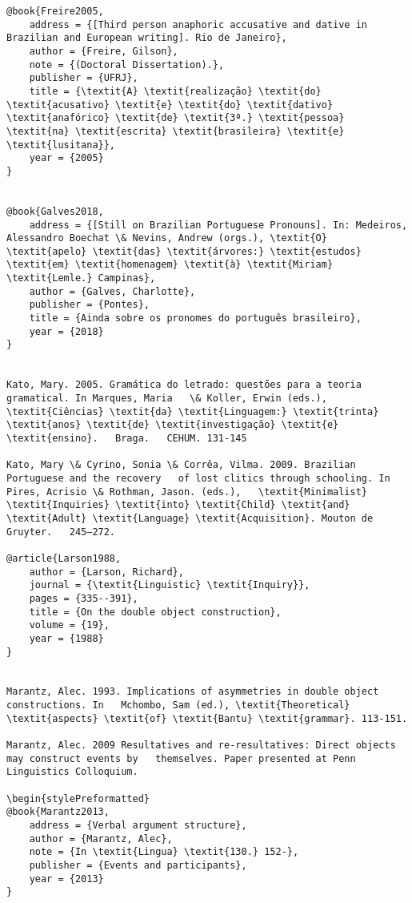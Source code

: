 \documentclass[output=paper,modfonts,nonflat]{langsci/langscibook}
\begin{document}
\begin{verbatim}
@book{Freire2005,
	address = {[Third person anaphoric accusative and dative in Brazilian and European writing]. Rio de Janeiro},
	author = {Freire, Gilson},
	note = {(Doctoral Dissertation).},
	publisher = {UFRJ},
	title = {\textit{A} \textit{realização} \textit{do} \textit{acusativo} \textit{e} \textit{do} \textit{dativo} \textit{anafórico} \textit{de} \textit{3ª.} \textit{pessoa} \textit{na} \textit{escrita} \textit{brasileira} \textit{e} \textit{lusitana}},
	year = {2005}
}


@book{Galves2018,
	address = {[Still on Brazilian Portuguese Pronouns]. In: Medeiros, Alessandro Boechat \& Nevins, Andrew (orgs.), \textit{O} \textit{apelo} \textit{das} \textit{árvores:} \textit{estudos} \textit{em} \textit{homenagem} \textit{à} \textit{Miriam} \textit{Lemle.} Campinas},
	author = {Galves, Charlotte},
	publisher = {Pontes},
	title = {Ainda sobre os pronomes do português brasileiro},
	year = {2018}
}


Kato, Mary. 2005. Gramática do letrado: questões para a teoria gramatical. In Marques, Maria   \& Koller, Erwin (eds.), \textit{Ciências} \textit{da} \textit{Linguagem:} \textit{trinta} \textit{anos} \textit{de} \textit{investigação} \textit{e} \textit{ensino}.   Braga.   CEHUM. 131-145

Kato, Mary \& Cyrino, Sonia \& Corrêa, Vilma. 2009. Brazilian Portuguese and the recovery   of lost clitics through schooling. In Pires, Acrisio \& Rothman, Jason. (eds.),   \textit{Minimalist} \textit{Inquiries} \textit{into} \textit{Child} \textit{and} \textit{Adult} \textit{Language} \textit{Acquisition}. Mouton de Gruyter.   245–272.

@article{Larson1988,
	author = {Larson, Richard},
	journal = {\textit{Linguistic} \textit{Inquiry}},
	pages = {335--391},
	title = {On the double object construction},
	volume = {19},
	year = {1988}
}


Marantz, Alec. 1993. Implications of asymmetries in double object constructions. In   Mchombo, Sam (ed.), \textit{Theoretical} \textit{aspects} \textit{of} \textit{Bantu} \textit{grammar}. 113-151.

Marantz, Alec. 2009 Resultatives and re-resultatives: Direct objects may construct events by   themselves. Paper presented at Penn Linguistics Colloquium.

\begin{stylePreformatted}
@book{Marantz2013,
	address = {Verbal argument structure},
	author = {Marantz, Alec},
	note = {In \textit{Lingua} \textit{130.} 152-},
	publisher = {Events and participants},
	year = {2013}
}


\end{verbatim}
\end{document}
